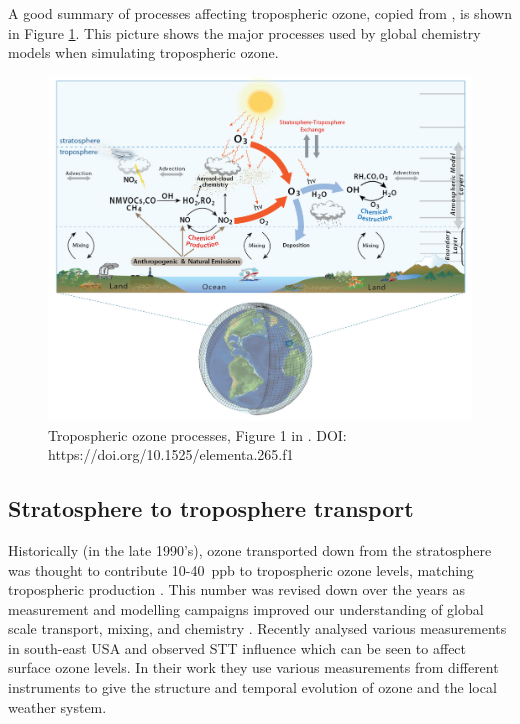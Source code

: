   A good summary of processes affecting tropospheric ozone, copied from \cite{Young2018}, is shown in Figure \ref{LR:O3:YoungOzoneSummary}.
  This picture shows the major processes used by global chemistry models when simulating tropospheric ozone.
  
  
  \begin{figure}
    \includegraphics[width=\textwidth]{Figures/Young2018_Figure1.png}
    \caption{%
      Tropospheric ozone processes, Figure 1 in \cite{Young2018}.
      DOI: https://doi.org/10.1525/elementa.265.f1
      }
    \label{LR:O3:YoungOzoneSummary}
  \end{figure}
  
  \subsection{Stratosphere to troposphere transport}
    \label{LR:O3:STT}
    Historically (in the late 1990's), ozone transported down from the stratosphere was thought to contribute 10-40~ppb to tropospheric ozone levels, matching tropospheric production \citep{Atkinson2000, Stohl2003}.
    This number was revised down over the years as measurement and modelling campaigns improved our understanding of global scale transport, mixing, and chemistry \citep{Monks2015}.
    Recently \cite{Kuang2017} analysed various measurements in south-east USA and observed STT influence which can be seen to affect surface ozone levels.
    In their work they use various measurements from different instruments to give the structure and temporal evolution of ozone and the local weather system.
    
